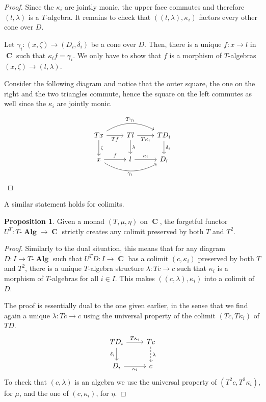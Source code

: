 \documentclass[a4paper,11pt,fullpage,oneside,openany]{amsbook}
\DeclareMathOperator{\Alg}{\mathbf{Alg}}
\DeclareMathOperator{\C}{\mathbf{C}}
\theoremstyle{definition}
\theoremstyle{definition}
\newtheorem{prop}[thm]{Proposition}
\theoremstyle{remark}
\begin{document}
\begin{proof}
	Since the $\kappa_i$ are jointly monic, the upper face commutes and therefore $(l,\lambda)$ is a $T$-algebra. It remains to check that $((l,\lambda),\kappa_i)$ factors every other cone over $D$.
	
	Let $\gamma_i\colon(x,\zeta)\rightarrow (D_i,\delta_i)$ be a cone over $D$. Then, there is a unique $f\colon x\rightarrow l$ in $\C$ such that $\kappa_if=\gamma_i$. We only have to show that $f$ is a morphism of $T$-algebras $(x,\zeta)\rightarrow (l,\lambda)$.
	
	Consider the following diagram and notice that the outer square, the one on the right and the two triangles commute, hence the square on the left commutes as well since the $\kappa_i$ are jointly monic.
	
	\[
		\begin{tikzcd}
			Tx\ar[rr, bend left, "T\gamma_i"]\ar[r, swap, "Tf"]\ar[d, "\zeta"]
			& Tl\ar[r, swap, "T\kappa_i"]\ar[d, "\lambda"]
			& TD_i\ar[d, "\delta_i"] \\
			x\ar[r, "f"]\ar[rr, bend right, swap, "\gamma_i"]
			& l\ar[r, "\kappa_i"]
			& D_i
		\end{tikzcd}
	\]
\end{proof}

A similar statement holds for colimits.

\begin{prop}\label{create colims}
Given a monad $(T,\mu,\eta)$ on $\C$, the forgetful functor $U^T\colon T\mbox{-}\Alg\rightarrow\C$ strictly creates any colimit preserved by both $T$ and $T^2$.
\end{prop}

\begin{proof}
	Similarly to the dual situation, this means that for any diagram $D\colon I\rightarrow T\mbox{-}\Alg$ such that $U^TD\colon I\rightarrow\C$ has a colimit $(c,\kappa_i)$ preserved by both $T$ and $T^2$, there is a unique $T$-algebra structure $\lambda\colon Tc\rightarrow c$ such that $\kappa_i$ is a morphism of $T$-algebras for all $i\in I$. This makes $((c,\lambda),\kappa_i)$ into a colimit of $D$.
	
	The proof is essentially dual to the one given earlier, in the sense that we find again a unique $\lambda\colon Tc\rightarrow c$ using the universal property of the colimit $(Tc,T\kappa_i)$ of $TD$.
	\[
		\begin{tikzcd}
			TD_i\ar[r, "T\kappa_i"]\ar[d, "\delta_i"']
			& Tc\ar[d, dashed, "\lambda"] \\
			D_i\ar[r, "\kappa_i"']
			& c
		\end{tikzcd}
	\]
	To check that $(c,\lambda)$ is an algebra we use the universal property of $(T^2c,T^2\kappa_i)$, for $\mu$, and the one of $(c,\kappa_i)$, for $\eta$.
\end{proof}
\end{document}
